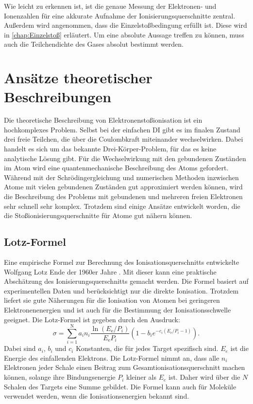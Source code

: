 Wie leicht zu erkennen ist, ist die genaue Messung der Elektronen- und Ionenzahlen für eine akkurate Aufnahme der Ionisierungsquerschnitte zentral. Außerdem wird angenommen, dass die Einzelstoßbedingung erfüllt ist. Diese wird in \ref{chap:Einzelstoß} erläutert. Um eine absolute Aussage treffen zu können, muss auch die Teilchendichte des Gases absolut bestimmt werden.


\section{Ansätze theoretischer Beschreibungen}
Die theoretische Beschreibung von Elektronenstoßionisation ist ein hochkomplexes Problem. Selbst bei der einfachen DI gibt es im finalen Zustand drei freie Teilchen, die über die Coulombkraft miteinander wechselwirken. Dabei handelt es sich um das bekannte Drei-Körper-Problem, für das es keine analytische Lösung gibt. Für die Wechselwirkung mit den gebundenen Zuständen im Atom wird eine quantenmechanische Beschreibung des Atoms gefordert. Während mit der Schrödingergleichung und numerischen Methoden inzwischen Atome mit vielen gebundenen Zuständen gut approximiert werden können, wird die Beschreibung des Problems mit gebundenen und mehreren freien Elektronen sehr schnell sehr komplex. Trotzdem sind einige Ansätze entwickelt worden, die die Stoßionisierungsquerschnitte für Atome gut nähern können.

\subsection{Lotz-Formel}
Eine empirische Formel zur Berechnung des Ionisationsquerschnitts entwickelte Wolfgang Lotz Ende der 1960er Jahre \cite{Lotz}. Mit dieser kann eine praktische Abschätzung des Ionisierungsquerschnitts gemacht werden. Die Formel basiert auf experimentellen Daten und berücksichtigt nur die direkte Ionisation. Trotzdem liefert sie gute Näherungen für die Ionisation von Atomen bei geringeren Elektronenenergien und ist auch für die Bestimmung der Ionisationsschwelle geeignet. Die Lotz-Formel ist gegeben durch den Ausdruck:
\begin{equation}
    \sigma = \sum_{i=1}^{\text{N}} a_{i} n_{i} \frac{ \ln \left( E_{\text{e}} / P_{i} \right) }{ E_{\text{e}} P_{i} } \left( 1 - b_{i} e ^{-c_{i} \left( E_{\text{e}} / P_{i} - 1 \right)} \right).
\end{equation}
Dabei sind $a_i$, $b_i$ und $c_i$ Konstanten, die für jedes Target spezifisch sind. $E_e$ ist die Energie des einfallenden Elektrons. Die Lotz-Formel nimmt an, dass alle $n_i$ Elektronen jeder Schale einen Beitrag zum Gesamtionisationsquerschnitt machen können, solange ihre Bindungsenergie $P_i$ kleiner als $E_e$ ist. Daher wird über die $N$ Schalen des Targets eine Summe gebildet. Die Formel kann auch für Moleküle verwendet werden, wenn die Ionisationsenergien bekannt sind.

